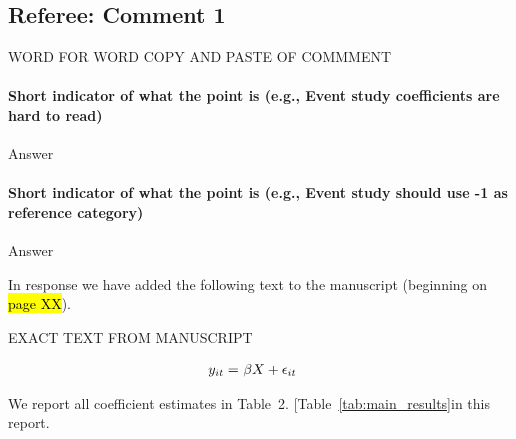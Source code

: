 \subsection*{Referee: Comment 1} 

\begin{tcolorbox}[left = 1em, top = 1ex, bottom = 1ex, colupper=black, colback=black!10, adjusted title = Referee: Comment 1]
    \setlength\parindent{2em}
	\noindent
	\ttfamily
	
	WORD FOR WORD COPY AND PASTE OF COMMMENT
\end{tcolorbox}


\paragraph{Short indicator of what the point is (e.g., Event study coefficients are hard to read)} Answer 

\paragraph{Short indicator of what the point is (e.g., Event study should use -1 as reference category)} Answer 

In response we have added the following text to the manuscript (beginning on \hl{page XX}).
    
	\begin{tcolorbox}[left = 1em, top = 1ex, bottom = 1ex, colupper=black, colback=white, adjusted title = From page \hl{XX}]
    
       EXACT TEXT FROM MANUSCRIPT
    
        \begin{align}
            y_{it} = &~\beta X + \epsilon_{it} \notag
        \end{align}
        
        We report all coefficient estimates in Table~2. {\color{red} {\ttfamily[Table~\ref{tab:main_results}in this report.}} \\

        {\color{red} {}} \\
    \end{tcolorbox}    
